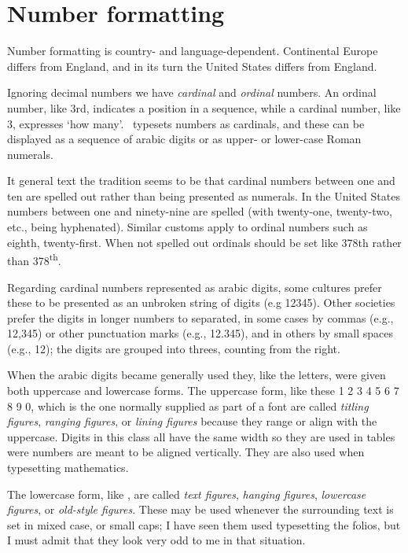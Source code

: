 \documentclass[10pt,a4paper,extrafontsizes]{memoir}
\begin{document}

\section{Number formatting}

\begin{paracol}{2}
\switchEng
    Number formatting is country- and language-dependent. Continental 
Europe differs
from England, and in its turn the United States differs from England.

    Ignoring decimal numbers we have \emph{cardinal} and \emph{ordinal}
numbers. An ordinal number, like 3rd, 
indicates a position in a sequence,
while a cardinal number, like 3, 
expresses `how many'. \ltx\ typesets
numbers as cardinals, and these can be displayed as a sequence of
arabic digits or as upper- or lower-case Roman numerals. 

    It general text the tradition seems to be that cardinal numbers between
one and ten are spelled out rather than being presented as numerals.
In the United States numbers between one and ninety-nine are spelled (with
twenty-one, twenty-two, etc., being hyphenated). Similar customs
apply to ordinal numbers such as eighth, twenty-first. When not spelled out
ordinals should be set like 378th rather than 378\textsuperscript{th}.


    Regarding cardinal numbers represented as arabic digits,
some cultures prefer these to be presented as an unbroken string of
digits (e.g 12345). Other societies prefer the digits in longer 
numbers to separated, in some cases by commas (e.g., 12,345) or other 
punctuation marks (e.g., 12.345), and in others by small spaces (e.g., 12); 
the digits are grouped into threes, counting from the right.

   When the arabic digits became generally used they, like the letters, 
were given both uppercase and lowercase forms. The uppercase form, like these
1 2 3 4 5 6 7 8 9 0, which
is the one normally supplied as part of a font are called 
\emph{titling figures}, 
\emph{ranging figures}, or
\emph{lining figures} because
they range or align with the uppercase.
Digits in this class all
have the same width so they are used in tables were numbers are meant to
be aligned vertically. They are also used when typesetting mathematics.

    The lowercase form, like , are called
\emph{text figures},
\emph{hanging figures},
\emph{lowercase figures}, or
\emph{old-style figures}.
These may be used whenever the surrounding text is set in mixed case, or small caps; I
have seen them used typesetting the folios, but I must admit that they look very odd
to me in that situation.


\end{paracol}
\end{document}
